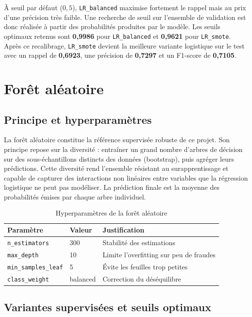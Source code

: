 \documentclass[12pt,a4paper,twoside]{report}
\begin{document}
À seuil par défaut ($0{,}5$), \texttt{LR\_balanced} maximise fortement le rappel mais au prix d'une précision très faible. Une recherche de seuil sur l'ensemble de validation est donc réalisée à partir des probabilités produites par le modèle. Les seuils optimaux retenus sont \textbf{0,9986} pour \texttt{LR\_balanced} et \textbf{0,9621} pour \texttt{LR\_smote}. Après ce recalibrage, \texttt{LR\_smote} devient la meilleure variante logistique sur le test avec un rappel de \textbf{0,6923}, une précision de \textbf{0,7297} et un F1-score de \textbf{0,7105}.

\section{Forêt aléatoire}

\subsection{Principe et hyperparamètres}

La forêt aléatoire constitue la référence supervisée robuste de ce projet. Son principe repose sur la diversité : entraîner un grand nombre d'arbres de décision sur des sous-échantillons distincts des données (bootstrap), puis agréger leurs prédictions. Cette diversité rend l'ensemble résistant au surapprentissage et capable de capturer des interactions non linéaires entre variables que la régression logistique ne peut pas modéliser. La prédiction finale est la moyenne des probabilités émises par chaque arbre individuel.

\begin{table}[H]
\centering
\caption{Hyperparamètres de la forêt aléatoire}
\label{tab:rf_params}
\begin{tabular}{lll}
\toprule
\textbf{Paramètre} & \textbf{Valeur} & \textbf{Justification} \\
\midrule
\texttt{n\_estimators}    & 300 & Stabilité des estimations \\
\texttt{max\_depth}       & 10  & Limite l'overfitting sur peu de fraudes \\
\texttt{min\_samples\_leaf} & 5 & Évite les feuilles trop petites \\
\texttt{class\_weight}    & balanced & Correction du déséquilibre \\
\bottomrule
\end{tabular}
\end{table}

\subsection{Variantes supervisées et seuils optimaux}
\end{document}
